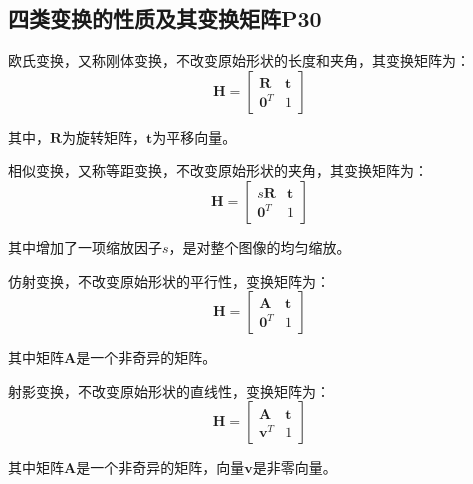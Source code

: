 \documentclass[11pt]{article}
\begin{document}
\subsection{四类变换的性质及其变换矩阵P30}
欧氏变换，又称刚体变换，不改变原始形状的长度和夹角，其变换矩阵为：
\begin{equation*}
  \mathbold{H}=\begin{bmatrix}
    \mathbold{R}   & \mathbold{t} \\
    \mathbold{0}^T & 1
  \end{bmatrix}
\end{equation*}\par
其中，$\mathbold{R}$为旋转矩阵，$\mathbold{t}$为平移向量。\par
相似变换，又称等距变换，不改变原始形状的夹角，其变换矩阵为：
\begin{equation*}
  \mathbold{H}=\begin{bmatrix}
    s\mathbold{R} & \mathbold{t} \\
    \mathbold{0}^T & 1
  \end{bmatrix}
\end{equation*}\par
其中增加了一项缩放因子$s$，是对整个图像的均匀缩放。\par
仿射变换，不改变原始形状的平行性，变换矩阵为：
\begin{equation*}
  \mathbold{H}=\begin{bmatrix}
    \mathbold{A}   & \mathbold{t} \\
    \mathbold{0}^T & 1
  \end{bmatrix}
\end{equation*}\par
其中矩阵$\mathbold{A}$是一个非奇异的矩阵。\par
射影变换，不改变原始形状的直线性，变换矩阵为：
\begin{equation*}
  \mathbold{H}=\begin{bmatrix}
    \mathbold{A}   & \mathbold{t} \\
    \mathbold{v}^T & 1
  \end{bmatrix}
\end{equation*}\par
其中矩阵$\mathbold{A}$是一个非奇异的矩阵，向量$\mathbold{v}$是非零向量。
\end{document}
